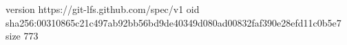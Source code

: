 version https://git-lfs.github.com/spec/v1
oid sha256:00310865c21c497ab92bb56bd9de40349d080ad00832faf390e28efd11c0b5e7
size 773
